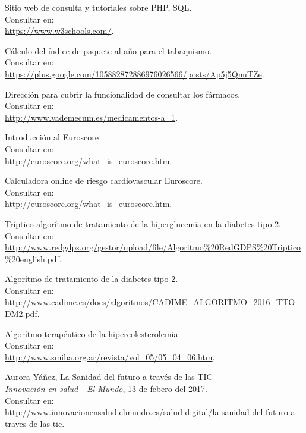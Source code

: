 \documentclass[11pt,spanish,
		listoftables,listoffigures]
		{tfgplantilla}
\begin{document}
\begin{thebibliography}{10}
   Sitio web de consulta y tutoriales sobre PHP, SQL.\\
   \newblock Consultar en:\\
   \url{ https://www.w3schools.com/}.

   Cálculo del índice de paquete al año para el tabaquismo.\\
   \newblock Consultar en:\\
   \url{ https://plus.google.com/105882872886976026566/posts/Ap5j5QnuTZe}.

   Dirección para cubrir la funcionalidad de consultar los fármacos.\\
   \newblock Consultar en:\\
   \url{ http://www.vademecum.es/medicamentos-a_1}.

   Introducción al Euroscore\\
   \newblock Consultar en:\\
   \url{ http://euroscore.org/what_is_euroscore.htm}.

   Calculadora online de riesgo cardiovascular Euroscore.\\
   \newblock Consultar en:\\
   \url{ http://euroscore.org/what_is_euroscore.htm}.

   Tríptico algorítmo de tratamiento de la hiperglucemia en la diabetes tipo 2.\\
   \newblock Consultar en:\\
   \url{ http://www.redgdps.org/gestor/upload/file/Algoritmo\%20RedGDPS\%20Triptico\%20english.pdf}.

   Algorítmo de tratamiento de la diabetes tipo 2.\\
   \newblock Consultar en:\\
   \url{ http://www.cadime.es/docs/algoritmos/CADIME_ALGORITMO_2016_TTO_DM2.pdf}.

   Algorítmo terapéutico de la hipercolesterolemia.\\
   \newblock Consultar en:\\
   \url{ http://www.smiba.org.ar/revista/vol_05/05_04_06.htm}.

   Aurora Yáñez, 
   \newblock La Sanidad del futuro a través de las TIC \\
   \newblock \textit{Innovación en salud - El Mundo}, 13 de febero del 2017.\\
   \newblock Consultar en:\\
   \url{ http://www.innovacionensalud.elmundo.es/salud-digital/la-sanidad-del-futuro-a-traves-de-las-tic}.


\end{thebibliography}
\end{document}
